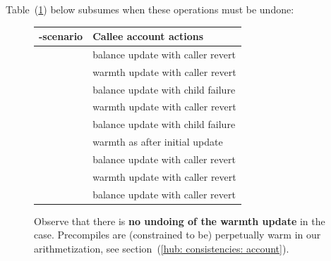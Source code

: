 \noindent Table~(\ref{hub: instruction handling: call: generalities: fig: when to revert warmth and balance}) below subsumes when these operations must be undone:
\begin{figure}
	\begin{center}
		\renewcommand{\arraystretch}{1.5}
		\begin{tabular}{|l|l|}
			\hline
			\inst{CALL}-scenario          & Callee account actions                                 \\ \hline \hline
			\scenCallEoaSuccessWillRevert & \undoSignifier{} balance update with \textcolor{draculapurple}{caller revert}     \\
			& \undoSignifier{} warmth  update with \textcolor{draculapurple}{caller revert}     \\ \hline \hline
			\scenCallSmcFailureWillRevert & \undoSignifier{} balance update with \textcolor{draculaorange}{child failure}     \\
			& \undoSignifier{} warmth  update with \textcolor{draculapurple}{caller revert}     \\ \hline
			\scenCallSmcFailureWontRevert & \undoSignifier{} balance update with \textcolor{draculaorange}{child failure}     \\
			& \sameSignifier{} warmth as after initial update        \\ \hline
			\scenCallSmcSuccessWillRevert & \undoSignifier{} balance update with \textcolor{draculapurple}{caller revert}     \\
			& \undoSignifier{} warmth  update with \textcolor{draculapurple}{caller revert}     \\ \hline \hline
			\scenCallPrcSuccessWillRevert & \undoSignifier{} balance update with \textcolor{draculapurple}{caller revert}     \\ \hline
		\end{tabular}
		\caption{Observe that there is \textbf{no undoing of the warmth update} in the \scenCallPrcSuccessWillRevert{} case. Precompiles are (constrained to be) perpetually warm in our arithmetization, see section~(\ref{hub: consistencies: account}).}
		\label{hub: instruction handling: call: generalities: fig: when to revert warmth and balance}
	\end{center}
\end{figure}

